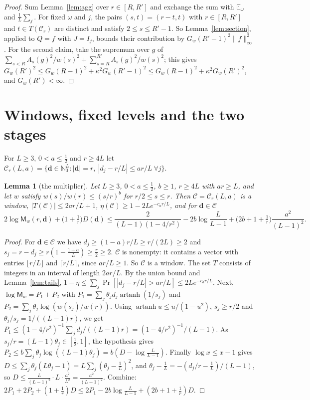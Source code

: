 \documentclass[11pt]{amsart}
\newtheorem{lemma}[theorem]{Lemma}
\theoremstyle{definition}
\newcommand{\N}{\mathbb{N}}
\newcommand{\E}{\mathbb{E}}
\newcommand{\artanh}{\operatorname{artanh}}
\newcommand{\bd}{\mathbf d}
\begin{document}
\begin{proof}
Sum Lemma~\ref{lem:agg} over $r\in[R,R']$ and exchange the sum with $\E_\omega$ and $\frac1L\sum_j$. For fixed $\omega$ and $j$, the pairs $(s,t)=(r-t,t)$ with $r\in[R,R']$ and $t\in T(\mathcal C_r)$ are distinct and satisfy $2\le s\le R'-1$. So Lemma~\ref{lem:section}, applied to $Q=f$ with $J=I_j$, bounds their contribution by $G_w(R'-1)^2\|f\|_\infty^2$. For the second claim, take the supremum over $g$ of $\sum_{s<R}A_s(g)^2/w(s)^2+\sum_{s=R}^{R'}A_s(g)^2/w(s)^2$; this gives $G_w(R')^2\le G_w(R-1)^2+\kappa^2G_w(R'-1)^2\le G_w(R-1)^2+\kappa^2G_w(R')^2$, and $G_w(R')<\infty$.
\end{proof}

\section{Windows, fixed levels and the two stages}\label{sec:stages}

For $L\ge3$, $0<a\le\frac12$ and $r\ge4L$ let $\mathcal C_r(L,a)=\{\bd\in\N_0^L:|\bd|=r,\ |d_j-r/L|\le ar/L\ \forall j\}$.

\begin{lemma}[the multiplier]\label{lem:mult}
Let $L\ge3$, $0<a\le\frac12$, $b\ge1$, $r\ge4L$ with $ar\ge L$, and let $w$ satisfy $w(s)/w(r)\le(s/r)^b$ for $r/2\le s\le r$. Then $\mathcal C=\mathcal C_r(L,a)$ is a window, $|T(\mathcal C)|\le 2ar/L+1$, $\eta(\mathcal C)\ge1-2Le^{-c_ar/L}$, and for $\bd\in\mathcal C$
\[
2\log\mathsf M_w(r,\bd)+\big(1+\tfrac1r\big)D(\bd)\le\frac{2}{(L-1)(1-4/r^2)}-2b\log\frac{L}{L-1}+\big(2b+1+\tfrac1r\big)\frac{a^2}{(L-1)^2}.
\]
\end{lemma}

\begin{proof}
For $\bd\in\mathcal C$ we have $d_j\ge(1-a)r/L\ge r/(2L)\ge2$ and $s_j=r-d_j\ge r(1-\frac{1+a}L)\ge\frac r2\ge2$. $\mathcal C$ is nonempty: it contains a vector with entries $\lfloor r/L\rfloor$ and $\lceil r/L\rceil$, since $ar/L\ge1$. So $\mathcal C$ is a window. The set $T$ consists of integers in an interval of length $2ar/L$. By the union bound and Lemma~\ref{lem:tails}, $1-\eta\le\sum_j\Pr[|d_j-r/L|>ar/L]\le2Le^{-c_ar/L}$. Next, $\log\mathsf M_w=P_1+P_2$ with $P_1=\sum_j\theta_jd_j\artanh(1/s_j)$ and $P_2=\sum_j\theta_j\log(w(s_j)/w(r))$. Using $\artanh u\le u/(1-u^2)$, $s_j\ge r/2$ and $\theta_j/s_j=1/((L-1)r)$, we get $P_1\le(1-4/r^2)^{-1}\sum_jd_j/((L-1)r)=(1-4/r^2)^{-1}/(L-1)$. As $s_j/r=(L-1)\theta_j\in[\frac12,1]$, the hypothesis gives $P_2\le b\sum_j\theta_j\log((L-1)\theta_j)=b(D-\log\frac L{L-1})$. Finally $\log x\le x-1$ gives $D\le\sum_j\theta_j(L\theta_j-1)=L\sum_j(\theta_j-\frac1L)^2$, and $\theta_j-\frac1L=-(d_j/r-\frac1L)/(L-1)$, so $D\le\frac{L}{(L-1)^2}\cdot L\cdot\frac{a^2}{L^2}=\frac{a^2}{(L-1)^2}$. Combine: $2P_1+2P_2+(1+\frac1r)D\le2P_1-2b\log\frac L{L-1}+(2b+1+\frac1r)D$.
\end{proof}
\end{document}
